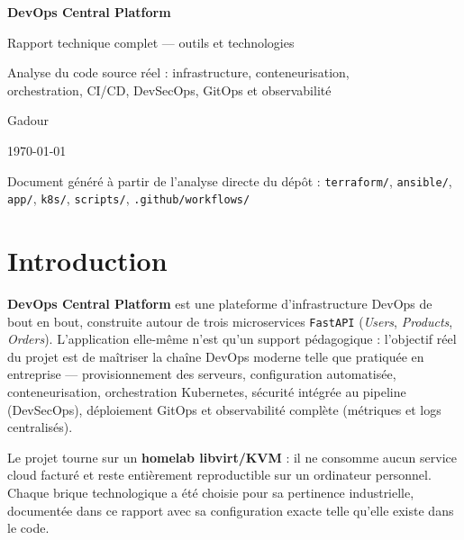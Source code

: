 \documentclass[11pt,a4paper]{article}
\begin{document}
\begin{titlepage}
  \centering
  \vspace*{1.8cm}
  {\Huge\bfseries DevOps Central Platform\par}
  \vspace{0.5cm}
  {\Large Rapport technique complet --- outils et technologies\par}
  \vspace{0.8cm}
  {\large Analyse du code source réel : infrastructure, conteneurisation,\\ orchestration, CI/CD, DevSecOps, GitOps et observabilité\par}
  \vfill
  {\large Gadour\par}
  \vspace{0.4cm}
  {\large \today\par}
  \vfill
  {\footnotesize Document généré à partir de l'analyse directe du dépôt : \texttt{terraform/}, \texttt{ansible/}, \texttt{app/}, \texttt{k8s/}, \texttt{scripts/}, \texttt{.github/workflows/}\par}
\end{titlepage}

\tableofcontents
\clearpage

\section{Introduction}

\textbf{DevOps Central Platform} est une plateforme d'infrastructure DevOps de bout en bout, construite autour de trois microservices \texttt{FastAPI} (\emph{Users}, \emph{Products}, \emph{Orders}). L'application elle-même n'est qu'un support pédagogique : l'objectif réel du projet est de maîtriser la chaîne DevOps moderne telle que pratiquée en entreprise --- provisionnement des serveurs, configuration automatisée, conteneurisation, orchestration Kubernetes, sécurité intégrée au pipeline (DevSecOps), déploiement GitOps et observabilité complète (métriques et logs centralisés).

Le projet tourne sur un \textbf{homelab libvirt/KVM} : il ne consomme aucun service cloud facturé et reste entièrement reproductible sur un ordinateur personnel. Chaque brique technologique a été choisie pour sa pertinence industrielle, documentée dans ce rapport avec sa configuration exacte telle qu'elle existe dans le code.
\end{document}
